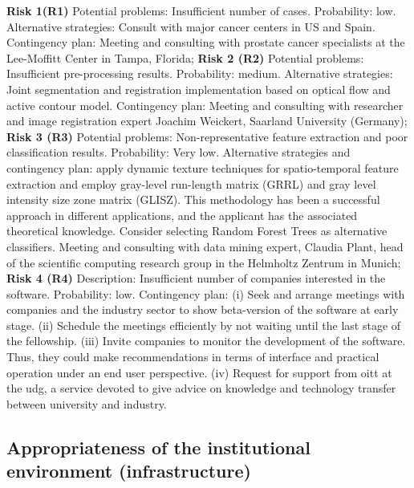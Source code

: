 \textbf{Risk 1(R1)} Potential problems: Insufficient number of cases. Probability: low. Alternative strategies:  Consult with major cancer centers in US and Spain. Contingency plan: Meeting and consulting with prostate cancer specialists at the Lee-Moffitt Center in Tampa, Florida; 
\textbf{Risk 2 (R2)} Potential problems: Insufficient pre-processing results. Probability: medium. Alternative strategies: Joint segmentation and registration implementation based on optical flow and active contour model. Contingency plan: Meeting and consulting with researcher and image registration expert Joachim Weickert, Saarland University (Germany);
\textbf{Risk 3 (R3)} Potential problems: Non-representative feature extraction and poor classification results. Probability: Very low. Alternative strategies and contingency plan: apply dynamic texture techniques for spatio-temporal feature extraction and employ gray-level run-length matrix (GRRL) and gray level intensity size zone matrix (GLISZ). 
This methodology has been a successful approach in different applications, and the applicant has the associated theoretical knowledge. 
Consider selecting Random Forest Trees as alternative classifiers. Meeting and consulting with data mining expert, Claudia Plant, head of the scientific computing research group in the Helmholtz Zentrum in Munich;
\textbf{Risk 4 (R4)} Description: Insufficient number of companies interested in the software. Probability: low. Contingency plan: (i) Seek and arrange meetings with companies and the industry sector to show beta-version of the software at early stage. (ii) Schedule the meetings efficiently by not waiting until the last stage of the fellowship. (iii) Invite companies to monitor the development of the software. Thus, they could make recommendations in terms of interface and practical operation under an end user perspective. (iv) Request for support from \ac{oitt} at the \ac{udg}, a service devoted to give advice on knowledge and technology transfer between university and industry.

\subsection{Appropriateness of the institutional environment (infrastructure)}
\label{sec:institution}

